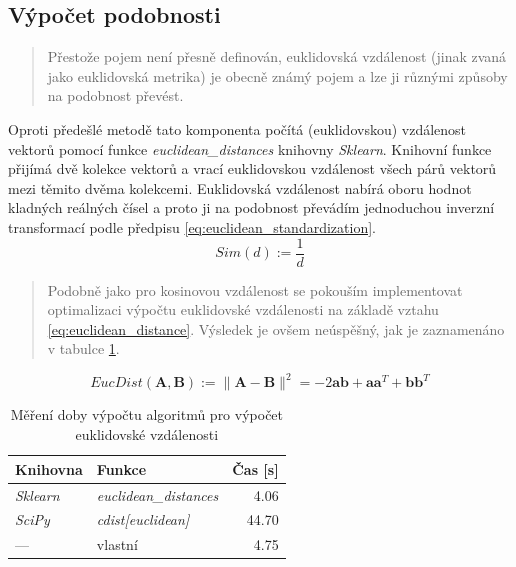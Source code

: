 \documentclass[thesis=M,czech]{FITthesis}[2019/12/23]
\begin{document}
\subsection{Výpočet  podobnosti}
\label{sec:component_euclidean_similarity}

\begin{quote}
Přestože pojem  není přesně definován, euklidovská vzdálenost (jinak zvaná jako euklidovská metrika) je obecně známý pojem a lze ji různými způsoby na podobnost převést.
\end{quote}

Oproti předešlé metodě tato komponenta počítá (euklidovskou) vzdálenost vektorů pomocí funkce \textit{euclidean\_distances} knihovny \textit{Sklearn}. Knihovní funkce přijímá dvě kolekce vektorů a vrací euklidovskou vzdálenost všech párů vektorů mezi těmito dvěma kolekcemi. Euklidovská vzdálenost nabírá oboru hodnot kladných reálných čísel a proto ji na podobnost převádím jednoduchou inverzní transformací podle předpisu
\ref{eq:euclidean_standardization}.
\begin{equation} \label{eq:euclidean_standardization}
Sim(d) := \frac{1}{d}
\end{equation}

\begin{quote}
    Podobně jako pro kosinovou vzdálenost se pokouším implementovat optimalizaci výpočtu euklidovské vzdálenosti na základě vztahu \ref{eq:euclidean_distance}\cite{dey2016}. Výsledek je ovšem neúspěšný, jak je zaznamenáno v tabulce \ref{table:experiment_similarity2}.
\end{quote}
\begin{equation} \label{eq:euclidean_distance}
EucDist(\mathbf{A}, \mathbf{B}) := \|\mathbf{A} - \mathbf{B}\|^2 = -2\mathbf{a}\mathbf{b} + \mathbf{a}\mathbf{a}^T + \mathbf{b}\mathbf{b}^T
\end{equation}
\begin{table}[h!]
\centering
\begin{tabular}{ |l|l|r| }
\hline
Knihovna & Funkce & Čas [s] \\\hline
\hline
\textit{Sklearn} & \textit{euclidean\_distances} & 4.06 \\
\textit{SciPy} & \textit{cdist[euclidean]} & 44.70 \\
--- & vlastní & 4.75 \\\hline
\end{tabular}
\caption{Měření doby výpočtu algoritmů pro výpočet euklidovské vzdálenosti}
\label{table:experiment_similarity2}
\end{table}
\end{document}
